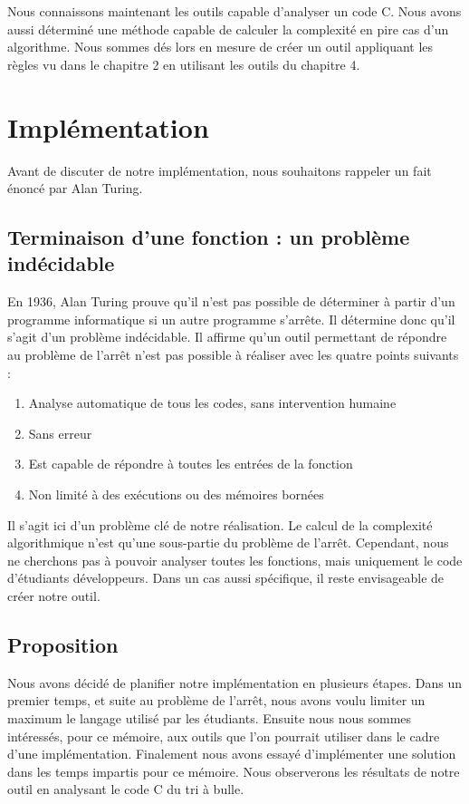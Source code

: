 \documentclass[12pt, twoside, openright]{report}
\begin{document}
Nous connaissons maintenant les outils capable d'analyser un code C. Nous avons aussi déterminé une méthode capable de calculer la complexité en pire cas d'un algorithme. Nous sommes dés lors en mesure de créer un outil appliquant les règles vu dans le chapitre 2 en utilisant les outils du chapitre 4.

\chapter{Implémentation}

Avant de discuter de notre implémentation, nous souhaitons rappeler un fait énoncé par Alan Turing.

\section{Terminaison d'une fonction : un problème indécidable \label{sect:rice}}

En 1936, Alan Turing prouve qu'il n'est pas possible de déterminer à partir d'un programme informatique si un autre programme s'arrête. \cite{haltingproblem01}  Il détermine donc qu'il s'agit d'un problème indécidable. Il affirme qu'un outil permettant de répondre au problème de l'arrêt n'est pas possible à réaliser avec les quatre points suivants \cite{analyseStatique01} : 

\begin{enumerate}
    \item Analyse automatique de tous les codes, sans intervention humaine
    \item Sans erreur
    \item Est capable de répondre à toutes les entrées de la fonction
    \item Non limité à des exécutions ou des mémoires bornées
\end{enumerate}

Il s'agit ici d'un problème clé de notre réalisation. Le calcul de la complexité algorithmique n'est qu'une sous-partie du problème de l'arrêt. Cependant, nous ne cherchons pas à pouvoir analyser toutes les fonctions, mais uniquement le code d'étudiants développeurs. Dans un cas aussi spécifique, il reste envisageable de créer notre outil.  

\section{Proposition}

Nous avons décidé de planifier notre implémentation en plusieurs étapes. Dans un premier temps, et suite au problème de l'arrêt, nous avons voulu limiter un maximum le langage utilisé par les étudiants. Ensuite nous nous sommes intéressés, pour ce mémoire, aux outils que l'on pourrait utiliser dans le cadre d'une implémentation. Finalement nous avons essayé d'implémenter une solution dans les temps impartis pour ce mémoire. Nous observerons les résultats de notre outil en analysant le code C du tri à bulle.
\end{document}
